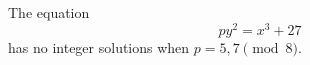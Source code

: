 \begin{proposition}
    The equation
\[
    py^2=x^3+27
\]
    has no integer solutions when $p=5,7\pmod8$.
\end{proposition}
